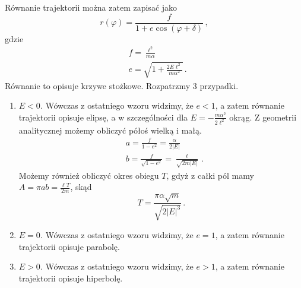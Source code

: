 \documentclass[../main.tex]{subfiles}
\begin{document}
Równanie trajektorii można zatem zapisać jako
\begin{equation*}
    r(\varphi)=\frac{f}{1+e\cos(\varphi+\delta)}\,,
\end{equation*}
gdzie
\begin{equation*}
    \begin{split}
        &f=\frac{\ell^2}{m\alpha}\\
        &e=\sqrt{1+\frac{2E\ell^2}{m\alpha^2}}\,.
    \end{split}
\end{equation*}
Równanie to opisuje krzywe stożkowe. Rozpatrzmy 3 przypadki.
\begin{enumerate}
    \item \textit{\(E<0\).} Wówczas z ostatniego wzoru widzimy, że \(e<1\), a zatem równanie trajektorii opisuje elipsę, a w szczególności dla \(E=-\frac{m\alpha^2}{2\ell^2}\) okrąg. Z geometrii analitycznej możemy obliczyć półoś wielką i małą.
    \begin{equation*}
    \begin{split}
        &a=\frac{f}{1-e^2}=\frac{\alpha}{2|E|}\\
        &b=\frac{f}{\sqrt{1-e^2}}=\frac{\ell}{\sqrt{2m|E|}}\,.
    \end{split}
    \end{equation*}
    Możemy również obliczyć okres obiegu \(T\), gdyż z całki pól mamy \(A=\pi ab=\frac{\ell T}{2m}\), skąd
    \begin{equation*}
        T=\frac{\pi\alpha\sqrt{m}}{\sqrt{2|E|^3}}\,.
    \end{equation*}
    \item \textit{\(E=0\).} Wówczas z ostatniego wzoru widzimy, że \(e=1\), a zatem równanie trajektorii opisuje parabolę.
    
    \item \textit{\(E>0\).} Wówczas z ostatniego wzoru widzimy, że \(e>1\), a zatem równanie trajektorii opisuje hiperbolę.
\end{enumerate}
\end{document}
